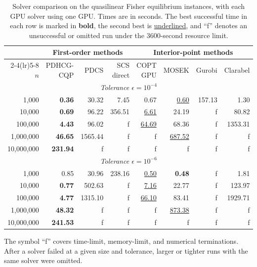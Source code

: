 \documentclass[letterpaper]{article} %
\newcommand{\name}{PDHCG-CQP\xspace}
\theoremstyle{definition}
\theoremstyle{remark}
\newcommand{\papertablesetup}{\small\setstretch{1.0}\renewcommand{\arraystretch}{1.2}}
\begin{document}
\begin{table}[htbp]
    \centering
  \papertablesetup
    \caption{Solver comparison on the quasilinear Fisher equilibrium
    instances, with each GPU solver using one GPU. Times are in seconds. The
    best successful time in each row is
    marked in \textbf{bold}, the second best is \underline{underlined}, and
    ``f'' denotes an unsuccessful or omitted run under the 3600-second
    resource limit.}
    \label{tab:fisher-solvers}
    \medskip
    \begin{tabular}{rrrrrrrr}
        \toprule
        & \multicolumn{3}{c}{First-order methods}
        & \multicolumn{4}{c}{Interior-point methods}\\
        \cmidrule(lr){2-4}\cmidrule(lr){5-8}
        $n$ & \name & PDCS & SCS direct & COPT GPU & MOSEK & Gurobi & Clarabel\\
        \midrule
        \multicolumn{8}{c}{\textit{Tolerance $\epsilon=10^{-4}$}}\\
        \midrule
        1,000      & \textbf{0.36} & 30.32 & 7.45 & 0.67 & \underline{0.60} & 157.13 & 1.30\\
        10,000     & \textbf{0.69} & 96.22 & 356.51 & \underline{6.61} & 24.19 & f & 80.82\\
        100,000    & \textbf{4.43} & 96.02 & f & \underline{64.69} & 68.36 & f & 1353.31\\
        1,000,000  & \textbf{46.65} & 1565.44 & f & f & \underline{687.52} & f & f\\
        10,000,000 & \textbf{231.94} & f & f & f & f & f & f\\
        \midrule
        \multicolumn{8}{c}{\textit{Tolerance $\epsilon=10^{-6}$}}\\
        \midrule
        1,000      & 0.85 & 30.96 & 238.16 & \underline{0.50} & \textbf{0.48} & f & 1.81\\
        10,000     & \textbf{0.77} & 502.63 & f & \underline{7.16} & 22.77 & f & 123.97\\
        100,000    & \textbf{4.77} & 1315.10 & f & \underline{66.10} & 83.41 & f & 1929.71\\
        1,000,000  & \textbf{48.32} & f & f & f & \underline{873.38} & f & f\\
        10,000,000 & \textbf{241.53} & f & f & f & f & f & f\\
        \bottomrule
    \end{tabular}
\end{table}

The symbol ``f'' covers time-limit, memory-limit, and numerical terminations.
After a solver failed at a given size and tolerance, larger or tighter runs
with the same solver were omitted.
\end{document}
